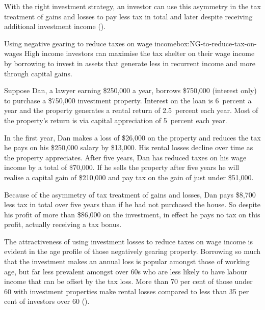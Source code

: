With the right investment strategy, an investor can use this asymmetry
in the tax treatment of gains and losses to pay less tax in total and
later despite receiving additional investment income ().

\begin{smallbox}{Using negative gearing to reduce taxes on wage income}{box:NG-to-reduce-tax-on-wages}
High income investors can maximise the tax shelter on their wage income
by borrowing to invest in assets that generate less in recurrent income
and more through capital gains.



Suppose Dan, a lawyer earning \$250,000 a year, 
borrows \$750,000 %
(interest only)
to purchase a \$750,000 investment property. Interest on the loan is 6~percent a
year and the property generates a rental return of 2.5~percent each
year. Most of the property's return is via capital appreciation of 5~percent each year.

In the first year, Dan makes a loss of \$26,000 
on the property and
reduces the tax he pays on his \$250,000 salary by 
\$13,000. His rental
losses decline over time as the property appreciates. After five years,
Dan has reduced taxes on his wage income by a total of 
\$70,000. If he
sells the property after five years he will realise a capital gain of
\$210,000 and pay tax on 
the gain of just under \$51,000.

Because of the asymmetry of tax treatment of gains and losses, Dan pays
\$8,700 less tax in total over five years than if he had not purchased
the house. So despite his profit of more than \$86,000 on the
investment, in effect he pays no tax on this profit, actually receiving a tax bonus.
\end{smallbox}
The attractiveness of using investment losses to reduce taxes on wage income is evident in the age profile of those negatively gearing property. Borrowing so much that the investment makes an annual loss is popular amongst those of working age, but far less prevalent amongst over 60s who are less likely to have labour income that can be offset by the tax loss. More than 70 per cent of those under 60 with investment properties make rental losses compared to less than 35 per cent of investors over 60 ().

